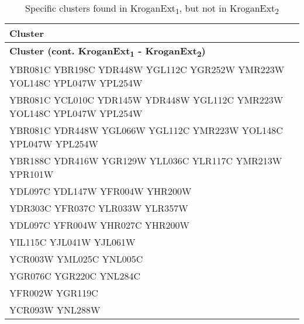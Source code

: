 \setlength{\extrarowheight}{2pt}
\renewcommand{\arraystretch}{1.2}
\begin{longtable}{| m{27em} |}
\caption{Specific clusters found in KroganExt\textsubscript{1}, but not in KroganExt\textsubscript{2}} \\
\hline
\textbf{Cluster} \\
\hline
\endfirsthead
\hline
\textbf{Cluster (cont. KroganExt\textsubscript{1} - KroganExt\textsubscript{2})} \\
\hline
\endhead
\hline
\endfoot
\hline
\endlastfoot
YBR081C YBR198C YDR448W YGL112C YGR252W YMR223W YOL148C YPL047W YPL254W \\
\hline
YBR081C YCL010C YDR145W YDR448W YGL112C YMR223W YOL148C YPL047W YPL254W \\
\hline
YBR081C YDR448W YGL066W YGL112C YMR223W YOL148C YPL047W YPL254W \\
\hline
YBR188C YDR416W YGR129W YLL036C YLR117C YMR213W YPR101W \\
\hline
YDL097C YDL147W YFR004W YHR200W \\
\hline
YDR303C YFR037C YLR033W YLR357W \\
\hline
YDL097C YFR004W YHR027C YHR200W \\
\hline
YIL115C YJL041W YJL061W \\
\hline
YCR003W YML025C YNL005C \\
\hline
YGR076C YGR220C YNL284C \\
\hline
YFR002W YGR119C \\
\hline
YCR093W YNL288W \\
\hline
\end{longtable}